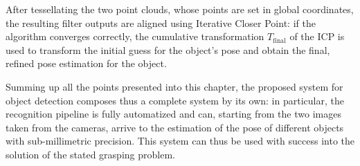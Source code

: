 After tessellating the two point clouds, whose points are set in global
coordinates, the resulting filter outputs are aligned using Iterative Closer Point: if the
algorithm converges correctly, the cumulative transformation
$T_{\text{final}}$ of the ICP is used to transform the initial guess for the object's
  pose and obtain the final, refined pose estimation for the object.

Summing up all the points presented into this chapter, the proposed
system for object detection composes thus a complete system by its
own: in particular, the recognition pipeline is fully automatized and
can, starting from the two images taken from the cameras, arrive to
the estimation of the pose of different objects with sub-millimetric
precision. This system can thus be used with success into the solution
of the stated grasping problem.
